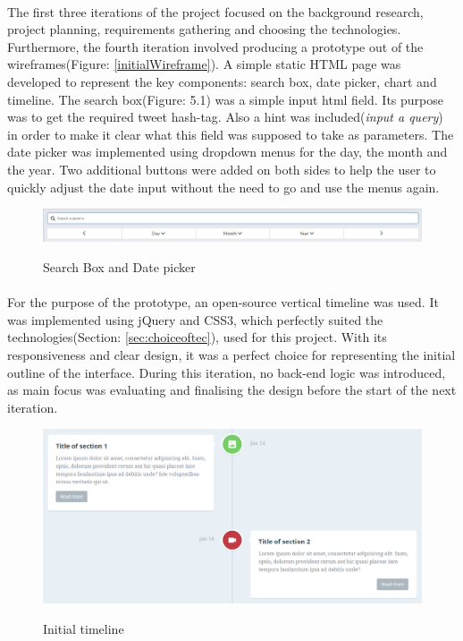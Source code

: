 \documentclass{l4proj}
\begin{document}
\paragraph{}
The first three iterations of the project focused on the background research, project planning, requirements gathering and choosing the technologies. Furthermore, the fourth iteration involved producing a prototype out of the wireframes(Figure: \ref{initialWireframe}). A simple static HTML page was developed to represent the key components: search box, date picker, chart and timeline. The search box(Figure: 5.1) was a simple input html field. Its purpose was to get the required tweet hash-tag. Also a hint was included(\textit{input a query}) in order to make it clear what this field was supposed to take as parameters. The date picker was implemented using dropdown menus for the day, the month and the year. Two additional buttons were added on both sides to help the user to quickly adjust the date input without the need to go and use the menus again.        

\begin{figure}[H]
	\centering
	\includegraphics[width=\textwidth]{images/searchboxwithdatepicker}
	\label{fig:searchbox}
	\caption{Search Box and Date picker}
\end{figure}

\paragraph{}
For the purpose of the prototype, an open-source vertical timeline was used. It was implemented using jQuery and CSS3, which perfectly suited the technologies(Section: \ref{sec:choiceoftec}), used for this project. With its responsiveness and clear design, it was a perfect choice for representing the initial outline of the interface. During this iteration, no back-end logic was introduced, as main focus was evaluating and finalising the design before the start of the next iteration. 

\begin{figure}[H]
	\centering
	\includegraphics[width=.5\textwidth]{images/opensourcetimeline}
	\label{fig:opensourcetimeline}
	\caption{Initial timeline}
\end{figure}
\end{document}
